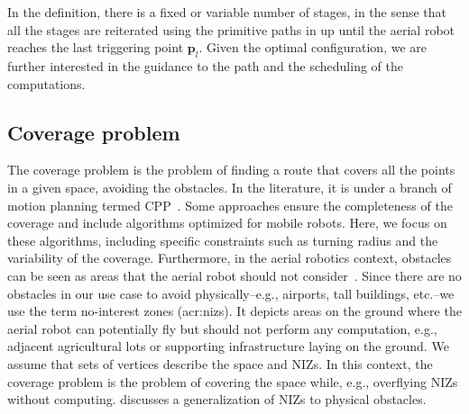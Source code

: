 In the definition, there is a fixed or variable number of stages, in the sense that all the stages are reiterated using the primitive paths in  up until the aerial robot reaches the last triggering point $\mathbf{p}_l$. Given the optimal configuration, we are further interested in the guidance to the path and the scheduling of the computations.

\subsection{Coverage problem}

The coverage problem is the problem of finding a route that covers all the points in a given space, avoiding the obstacles. In the literature, it is under a branch of motion planning termed CPP~\citep{choset1998coverage,choset2001coverage,galceran2013survey}. Some approaches ensure the completeness of the coverage and include algorithms optimized for mobile robots. Here, we focus on these algorithms, including specific constraints such as turning radius and the variability of the coverage.
Furthermore, in the aerial robotics context, obstacles can be seen as areas that the aerial robot should not consider~\citep{cabreira2019survey}. Since there are no obstacles in our use case to avoid physically--e.g., airports, tall buildings, etc.--we use the term no-interest zones (\Gls{acr:niz}s). It depicts areas on the ground where the aerial robot can potentially fly but should not perform any computation, e.g., adjacent agricultural lots or supporting infrastructure laying on the ground. We assume that sets of vertices describe the space and NIZs. In this context, the coverage problem is the problem of covering the space while, e.g., overflying NIZs without computing. 
 discusses a generalization of NIZs to physical obstacles. 

